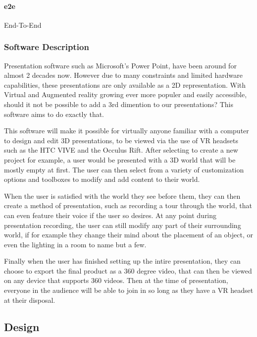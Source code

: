 			\paragraph{e2e} End-To-End



	\subsubsection{Software Description}

	Presentation software such as Microsoft’s Power Point, have been around for almost 2 decades now.  However due to many constraints and limited hardware capabilities, these presentations are only available as a 2D representation.  With Virtual and Augmented reality growing ever more populer and easily accessible, should it not be possible to add a 3rd dimention to our presentations?  This software aims to do exactly that.

	This software will make it possible for virtually anyone familiar with a computer to design and edit 3D presentations, to be viewed via the use of VR headsets such as the HTC VIVE and the Occulus Rift.  After selecting to create a new project for example, a user would be presented with a 3D world that will be mostly empty at first.  The user can then select from a variety of customization options and toolboxes to modify and add content to their world.

	When the user is satisfied with the world they see before them, they can then create a method of presentation, such as recording a tour through the world, that can even feature their voice if the user so desires.  At any point during presentation recording, the user can still modify any part of their surrounding world, if for example they change their mind about the placement of an object, or even the lighting in a room to name but a few.

	Finally when the user has finished setting up the intire presentation, they can choose to export the final product as a 360 degree video, that can then be viewed on any device that supports 360 videos.  Then at the time of presentation, everyone in the audience will be able to join in so long as they have a VR headset at their disposal.

\subsection{Design}

